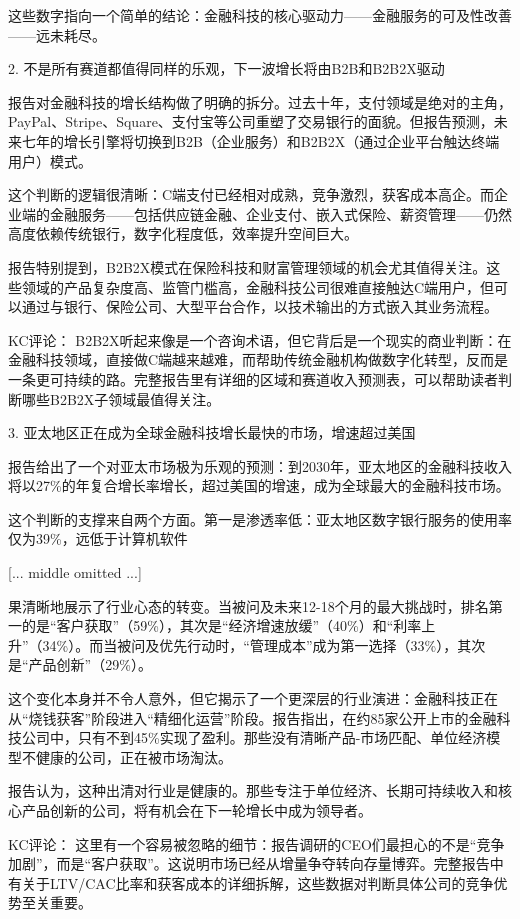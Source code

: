 \documentclass[11pt]{ctexart}
\begin{document}
这些数字指向一个简单的结论：金融科技的核心驱动力——金融服务的可及性改善——远未耗尽。

2. 不是所有赛道都值得同样的乐观，下一波增长将由B2B和B2B2X驱动

报告对金融科技的增长结构做了明确的拆分。过去十年，支付领域是绝对的主角，PayPal、Stripe、Square、支付宝等公司重塑了交易银行的面貌。但报告预测，未来七年的增长引擎将切换到B2B（企业服务）和B2B2X（通过企业平台触达终端用户）模式。

这个判断的逻辑很清晰：C端支付已经相对成熟，竞争激烈，获客成本高企。而企业端的金融服务——包括供应链金融、企业支付、嵌入式保险、薪资管理——仍然高度依赖传统银行，数字化程度低，效率提升空间巨大。

报告特别提到，B2B2X模式在保险科技和财富管理领域的机会尤其值得关注。这些领域的产品复杂度高、监管门槛高，金融科技公司很难直接触达C端用户，但可以通过与银行、保险公司、大型平台合作，以技术输出的方式嵌入其业务流程。

KC评论： B2B2X听起来像是一个咨询术语，但它背后是一个现实的商业判断：在金融科技领域，直接做C端越来越难，而帮助传统金融机构做数字化转型，反而是一条更可持续的路。完整报告里有详细的区域和赛道收入预测表，可以帮助读者判断哪些B2B2X子领域最值得关注。

3. 亚太地区正在成为全球金融科技增长最快的市场，增速超过美国

报告给出了一个对亚太市场极为乐观的预测：到2030年，亚太地区的金融科技收入将以27\%的年复合增长率增长，超过美国的增速，成为全球最大的金融科技市场。

这个判断的支撑来自两个方面。第一是渗透率低：亚太地区数字银行服务的使用率仅为39\%，远低于计算机软件

[... middle omitted ...]

果清晰地展示了行业心态的转变。当被问及未来12-18个月的最大挑战时，排名第一的是“客户获取”（59\%），其次是“经济增速放缓”（40\%）和“利率上升”（34\%）。而当被问及优先行动时，“管理成本”成为第一选择（33\%），其次是“产品创新”（29\%）。

这个变化本身并不令人意外，但它揭示了一个更深层的行业演进：金融科技正在从“烧钱获客”阶段进入“精细化运营”阶段。报告指出，在约85家公开上市的金融科技公司中，只有不到45\%实现了盈利。那些没有清晰产品-市场匹配、单位经济模型不健康的公司，正在被市场淘汰。

报告认为，这种出清对行业是健康的。那些专注于单位经济、长期可持续收入和核心产品创新的公司，将有机会在下一轮增长中成为领导者。

KC评论： 这里有一个容易被忽略的细节：报告调研的CEO们最担心的不是“竞争加剧”，而是“客户获取”。这说明市场已经从增量争夺转向存量博弈。完整报告中有关于LTV/CAC比率和获客成本的详细拆解，这些数据对判断具体公司的竞争优势至关重要。
\end{document}
